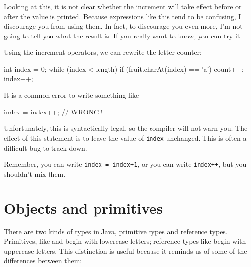 Looking at this, it is not clear whether the increment will take effect before or after the value is printed.
Because expressions like this tend to be confusing, I discourage you from using them.
In fact, to discourage you even more, I'm not going to tell you what the result is.
If you really want to know, you can try it.

Using the increment operators, we can rewrite the letter-counter:

\begin{code}
    int index = 0;
    while (index < length) {
        if (fruit.charAt(index) == 'a') {
            count++;
        }
        index++;
    }
\end{code}

It is a common error to write something like

\begin{code}
    index = index++;             // WRONG!!
\end{code}

Unfortunately, this is syntactically legal, so the compiler will not warn you.
The effect of this statement is to leave the value of {\tt index} unchanged.
This is often a difficult bug to track down.

Remember, you can write {\tt index = index+1}, or you can write {\tt index++}, but you shouldn't mix them.


\section{Objects and primitives}


There are two kinds of types in Java, primitive types and reference types.
Primitives, like  and  begin with lowercase letters; reference types like  begin with uppercase letters.
This distinction is useful because it reminds us of some of the differences between them:

